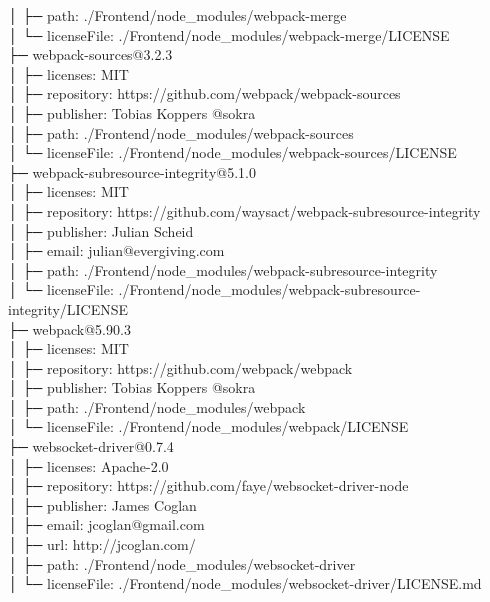 \documentclass[
    paper=a4,
    twoside=false,
    parskip=half,
    listof=entryprefix,
    listof=totoc,
    index=totoc,
    bibliography=totoc,
    headsepline,
]{scrbook}
\begin{document}
    │  ├─ path: ./Frontend/node\_modules/webpack-merge\\
    │  └─ licenseFile: ./Frontend/node\_modules/webpack-merge/LICENSE\\
    ├─ webpack-sources@3.2.3\\
    │  ├─ licenses: MIT\\
    │  ├─ repository: https://github.com/webpack/webpack-sources\\
    │  ├─ publisher: Tobias Koppers @sokra\\
    │  ├─ path: ./Frontend/node\_modules/webpack-sources\\
    │  └─ licenseFile: ./Frontend/node\_modules/webpack-sources/LICENSE\\
    ├─ webpack-subresource-integrity@5.1.0\\
    │  ├─ licenses: MIT\\
    │  ├─ repository: https://github.com/waysact/webpack-subresource-integrity\\
    │  ├─ publisher: Julian Scheid\\
    │  ├─ email: julian@evergiving.com\\
    │  ├─ path: ./Frontend/node\_modules/webpack-subresource-integrity\\
    │  └─ licenseFile: ./Frontend/node\_modules/webpack-subresource-integrity/LICENSE\\
    ├─ webpack@5.90.3\\
    │  ├─ licenses: MIT\\
    │  ├─ repository: https://github.com/webpack/webpack\\
    │  ├─ publisher: Tobias Koppers @sokra\\
    │  ├─ path: ./Frontend/node\_modules/webpack\\
    │  └─ licenseFile: ./Frontend/node\_modules/webpack/LICENSE\\
    ├─ websocket-driver@0.7.4\\
    │  ├─ licenses: Apache-2.0\\
    │  ├─ repository: https://github.com/faye/websocket-driver-node\\
    │  ├─ publisher: James Coglan\\
    │  ├─ email: jcoglan@gmail.com\\
    │  ├─ url: http://jcoglan.com/\\
    │  ├─ path: ./Frontend/node\_modules/websocket-driver\\
    │  └─ licenseFile: ./Frontend/node\_modules/websocket-driver/LICENSE.md\\
\end{document}
